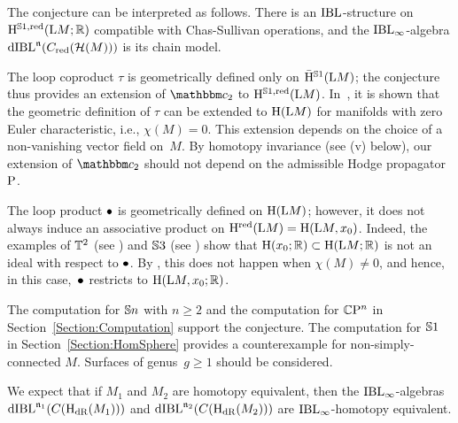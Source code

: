 \documentclass[\MainFolder/Text.tex]{subfiles}
\begin{document}
\begin{Remark}
\begin{RemarkList}
\item The conjecture can be interpreted as follows. There is an $\mathrm{IBL}$-structure on $\mathrm{H}^{\mathbb{S}{1}, \mathrm{red}}(\mathrm{L} M;\mathbb{R})$ compatible with Chas-Sullivan operations, and the $\mathrm{IBL}_\infty$-algebra $\mathrm{dIBL}^{\mathfrak{n}}(C_{\mathrm{red}}(\mathcal{H}(M)))$ is its chain model.
\item The loop coproduct $\tau$ is geometrically defined only on $\bar{\mathrm{H}}^{\mathbb{S}{1}}(\mathrm{L} M)$; the conjecture thus provides an extension of $\StringCoOp_2$ to $\mathrm{H}^{\mathbb{S}{1}, \mathrm{red}}(\mathrm{L} M)$. In~\cite{Basu2011}, it is shown that the geometric definition of $\tau$ can be extended to $\mathrm{H}(\mathrm{L} M)$ for manifolds with zero Euler characteristic, i.e., $\chi(M) = 0$. This extension depends on the choice of a non-vanishing vector field on~$M$. By homotopy invariance (see (v) below), our extension of $\StringCoOp_2$ should not depend on the admissible Hodge propagator $\mathrm{P}$.
\item The loop product $\bullet$ is geometrically defined on $\mathrm{H}(\mathrm{L} M)$; however, it does not always induce an associative product on $\mathrm{H}^{\mathrm{red}}(\mathrm{L} M) = \mathrm{H}(\mathrm{L} M, x_0)$. Indeed, the examples of $\mathbb{T}^2$ (see \cite{Basu2011}) and $\mathbb{S}{3}$ (see \cite{Sullivan1999}) show that $\mathrm{H}(x_0;\mathbb{R}) \subset \mathrm{H}(\mathrm{L} M;\mathbb{R})$ is not an ideal with respect to $\bullet$. By \cite{Tamanoi2010}, this does not happen when $\chi(M) \neq 0$, and hence, in this case,~$\bullet$ restricts to $\mathrm{H}(\mathrm{L} M, x_0; \mathbb{R})$.
\item The computation for $\mathbb{S}{n}$ with $n\ge 2$ and the computation for $\mathbb{C}\mathrm{P}^n$ in Section~\ref{Section:Computation} support the conjecture. The computation for $\mathbb{S}{1}$ in Section~\ref{Section:HomSphere} provides a counterexample for non-simply-connected $M$. Surfaces of genus~$g\ge 1$ should be considered.

\item  We expect that if $M_1$ and $M_2$ are homotopy equivalent, then the $\mathrm{IBL}_\infty$-algebras $\mathrm{dIBL}^{\mathfrak{n}_1}(C(\mathrm{H}_{\mathrm{dR}}(M_1)))$ and $\mathrm{dIBL}^{\mathfrak{n}_2}(C(\mathrm{H}_{\mathrm{dR}}(M_2)))$ are $\mathrm{IBL}_\infty$-homotopy equivalent.
\qedhere
\end{RemarkList}
\end{Remark}
\end{document}
